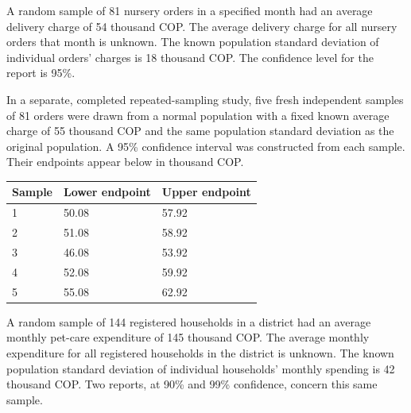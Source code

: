 
A random sample of 81 nursery orders in a specified month had an average delivery charge of 54 thousand COP. The average delivery charge for all nursery orders that month is unknown. The known population standard deviation of individual orders' charges is 18 thousand COP. The confidence level for the report is 95\%.

In a separate, completed repeated-sampling study, five fresh independent samples of 81 orders were drawn from a normal population with a fixed known average charge of 55 thousand COP and the same population standard deviation as the original population. A 95\% confidence interval was constructed from each sample. Their endpoints appear below in thousand COP.

\begin{center}\begin{tabular}{@{}lll@{}}\toprule
Sample & Lower endpoint & Upper endpoint\\\midrule
1 & 50.08 & 57.92\\
2 & 51.08 & 58.92\\
3 & 46.08 & 53.92\\
4 & 52.08 & 59.92\\
5 & 55.08 & 62.92\\
\bottomrule\end{tabular}\end{center}


A random sample of 144 registered households in a district had an average monthly pet-care expenditure of 145 thousand COP. The average monthly expenditure for all registered households in the district is unknown. The known population standard deviation of individual households' monthly spending is 42 thousand COP. Two reports, at 90\% and 99\% confidence, concern this same sample.

